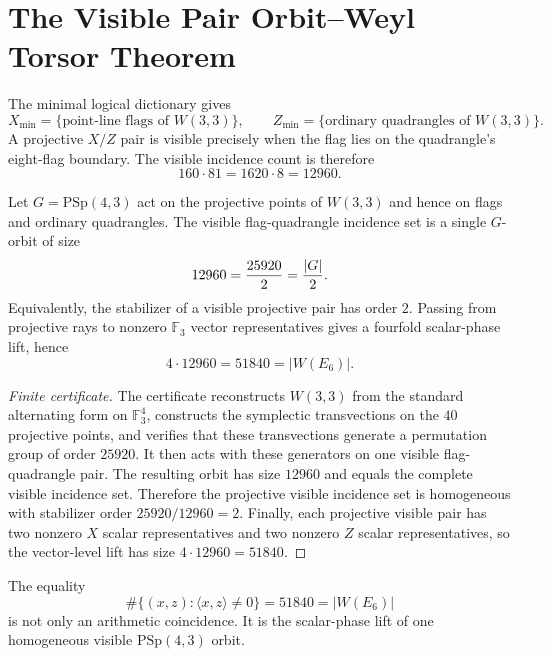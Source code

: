 
\section{The Visible Pair Orbit--Weyl Torsor Theorem}
\label{sec:visible-pair-orbit-weyl-torsor}

The minimal logical dictionary gives
\[
        X_{\min}=\{\text{point-line flags of }W(3,3)\},
        \qquad
        Z_{\min}=\{\text{ordinary quadrangles of }W(3,3)\}.
\]
A projective $X/Z$ pair is visible precisely when the flag lies on the quadrangle's
eight-flag boundary.  The visible incidence count is therefore
\[
        160\cdot81=1620\cdot8=12960.
\]

\begin{theorem}
Let $G=\mathrm{PSp}(4,3)$ act on the projective points of $W(3,3)$ and hence on
flags and ordinary quadrangles.  The visible flag-quadrangle incidence set is a
single $G$-orbit of size
\[
        12960={25920\over2}={|G|\over2}.
\]
Equivalently, the stabilizer of a visible projective pair has order $2$.
Passing from projective rays to nonzero $\mathbb F_3$ vector representatives gives
a fourfold scalar-phase lift, hence
\[
        4\cdot12960=51840=|W(E_6)|.
\]
\end{theorem}

\begin{proof}[Finite certificate]
The certificate reconstructs $W(3,3)$ from the standard alternating form on
$\mathbb F_3^4$, constructs the symplectic transvections on the $40$ projective
points, and verifies that these transvections generate a permutation group of order
$25920$.  It then acts with these generators on one visible flag-quadrangle pair.
The resulting orbit has size $12960$ and equals the complete visible incidence set.
Therefore the projective visible incidence set is homogeneous with stabilizer order
$25920/12960=2$.  Finally, each projective visible pair has two nonzero $X$ scalar
representatives and two nonzero $Z$ scalar representatives, so the vector-level lift
has size $4\cdot12960=51840$.
\end{proof}

\begin{corollary}
The equality
\[
        \#\{(x,z):\langle x,z\rangle\ne0\}=51840=|W(E_6)|
\]
is not only an arithmetic coincidence.  It is the scalar-phase lift of one homogeneous
visible $\mathrm{PSp}(4,3)$ orbit.
\end{corollary}
